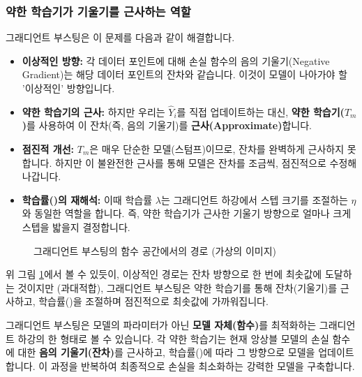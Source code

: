 \documentclass[11pt,a4paper]{book}
\theoremstyle{definition}
\begin{document}
\subsubsection{약한 학습기가 기울기를 근사하는 역할}
그래디언트 부스팅은 이 문제를 다음과 같이 해결합니다.
\begin{itemize}
    \item \textbf{이상적인 방향:} 각 데이터 포인트에 대해 손실 함수의 음의 기울기(Negative Gradient)는 해당 데이터 포인트의 잔차와 같습니다. 이것이 모델이 나아가야 할 '이상적인' 방향입니다.
    \item \textbf{약한 학습기의 근사:} 하지만 우리는 $\hat{Y}_i$를 직접 업데이트하는 대신, \textbf{약한 학습기($T_m$)}를 사용하여 이 잔차(즉, 음의 기울기)를 \textbf{근사(Approximate)}합니다.
    \item \textbf{점진적 개선:} $T_m$은 매우 단순한 모델(스텀프)이므로, 잔차를 완벽하게 근사하지 못합니다. 하지만 이 불완전한 근사를 통해 모델은 잔차를 조금씩, 점진적으로 수정해 나갑니다.
    \item \textbf{학습률(\texttt{\lambda})의 재해석:} 이때 학습률 $\lambda$는 그래디언트 하강에서 스텝 크기를 조절하는 $\eta$와 동일한 역할을 합니다. 즉, 약한 학습기가 근사한 기울기 방향으로 얼마나 크게 스텝을 밟을지 결정합니다.
\end{itemize}

\begin{figure}[h!]
    \centering
    \caption{그래디언트 부스팅의 함수 공간에서의 경로 (가상의 이미지)}
    \label{fig:gradient_boosting_path}
\end{figure}

위 그림 \ref{fig:gradient_boosting_path}에서 볼 수 있듯이, 이상적인 경로는 잔차 방향으로 한 번에 최솟값에 도달하는 것이지만 (과대적합), 그래디언트 부스팅은 약한 학습기를 통해 잔차(기울기)를 근사하고, 학습률(\texttt{\lambda})을 조절하며 점진적으로 최솟값에 가까워집니다.

\begin{tcolorbox}[summary, title={그래디언트 부스팅 = 함수 공간에서의 그래디언트 하강}] %
그래디언트 부스팅은 모델의 파라미터가 아닌 \textbf{모델 자체(함수)}를 최적화하는 그래디언트 하강의 한 형태로 볼 수 있습니다. 각 약한 학습기는 현재 앙상블 모델의 손실 함수에 대한 \textbf{음의 기울기(잔차)}를 근사하고, 학습률(\texttt{\lambda})에 따라 그 방향으로 모델을 업데이트합니다. 이 과정을 반복하여 최종적으로 손실을 최소화하는 강력한 모델을 구축합니다.
\end{tcolorbox}
\end{document}
